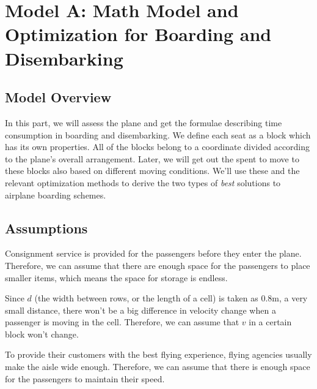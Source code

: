 \documentclass{article}
\theoremstyle{definition}
\theoremstyle{remark}
\numberwithin{equation}{section}
\begin{document}
	\section{Model A: Math Model and Optimization for Boarding and Disembarking}
	\subsection{Model Overview}
	In this part, we will assess the plane and get the formulae describing time consumption in boarding and disembarking. We define each seat as a block which has its own properties. All of the blocks belong to a coordinate divided according to the plane's overall arrangement. Later, we will get out the spent to move to these blocks also based on different moving conditions. We'll use these and the relevant optimization methods to derive the two types of \textit{best} solutions to airplane boarding schemes.
	\subsection{Assumptions}
	\begin{enumerate}

		Consignment service is provided for the passengers before they enter the plane. Therefore, we can assume that there are enough space for the passengers to place smaller items, which means the space for storage is endless.

		Since $d$ (the width between rows, or the length of a cell) is taken as 0.8$\mathrm{m}$, a very small distance, there won't be a big difference in velocity change when a passenger is moving in the cell. Therefore, we can assume that $v$ in a certain block won't change.

		To provide their customers with the best flying experience, flying agencies usually make the aisle wide enough.  Therefore, we can assume that there is enough space for the passengers to maintain their speed.
	\end{enumerate}
\end{document}
